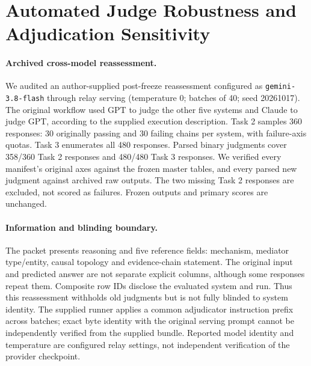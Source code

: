 \clearpage
\section{Automated Judge Robustness and Adjudication Sensitivity}\label{app:judge_robustness}
\paragraph{Archived cross-model reassessment.} We audited an author-supplied post-freeze reassessment configured as \texttt{gemini-3.8-flash} through relay serving (temperature 0; batches of 40; seed 20261017). The original workflow used GPT to judge the other five systems and Claude to judge GPT, according to the supplied execution description. Task 2 samples 360 responses: 30 originally passing and 30 failing chains per system, with failure-axis quotas. Task 3 enumerates all 480 responses. Parsed binary judgments cover 358/360 Task 2 responses and 480/480 Task 3 responses. We verified every manifest's original axes against the frozen master tables, and every parsed new judgment against archived raw outputs. The two missing Task 2 responses are excluded, not scored as failures. Frozen outputs and primary scores are unchanged.

\paragraph{Information and blinding boundary.} The packet presents reasoning and five reference fields: mechanism, mediator type/entity, causal topology and evidence-chain statement. The original input and predicted answer are not separate explicit columns, although some responses repeat them. Composite row IDs disclose the evaluated system and run. Thus this reassessment withholds old judgments but is not fully blinded to system identity. The supplied runner applies a common adjudicator instruction prefix across batches; exact byte identity with the original serving prompt cannot be independently verified from the supplied bundle. Reported model identity and temperature are configured relay settings, not independent verification of the provider checkpoint.

